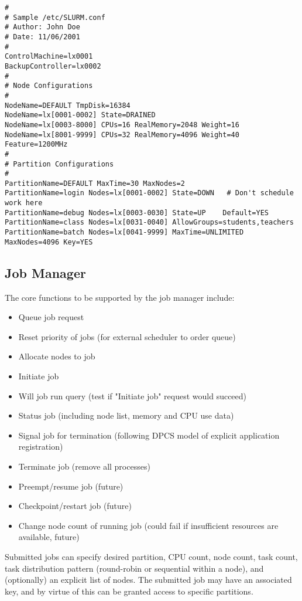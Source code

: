 \begin{verbatim}
# 
# Sample /etc/SLURM.conf
# Author: John Doe
# Date: 11/06/2001
#
ControlMachine=lx0001
BackupController=lx0002
#
# Node Configurations
#
NodeName=DEFAULT TmpDisk=16384
NodeName=lx[0001-0002] State=DRAINED
NodeName=lx[0003-8000] CPUs=16 RealMemory=2048 Weight=16
NodeName=lx[8001-9999] CPUs=32 RealMemory=4096 Weight=40 Feature=1200MHz
#
# Partition Configurations
#
PartitionName=DEFAULT MaxTime=30 MaxNodes=2
PartitionName=login Nodes=lx[0001-0002] State=DOWN   # Don't schedule work here
PartitionName=debug Nodes=lx[0003-0030] State=UP    Default=YES
PartitionName=class Nodes=lx[0031-0040] AllowGroups=students,teachers
PartitionName=batch Nodes=lx[0041-9999] MaxTime=UNLIMITED MaxNodes=4096 Key=YES
\end{verbatim}

\subsection{Job Manager}

The core functions to be supported by the job manager include:
\begin{itemize}
\item Queue job request
\item Reset priority of jobs (for external scheduler to order queue)
\item Allocate nodes to job
\item Initiate job
\item Will job run query (test if "Initiate job" request would succeed)
\item Status job (including node list, memory and CPU use data)
\item Signal job for termination (following DPCS model of explicit application
registration)
\item Terminate job (remove all processes)
\item Preempt/resume job  (future)
\item Checkpoint/restart job (future)
\item Change node count of running job (could fail if insufficient resources are 
available, future)
\end{itemize}

Submitted jobs can specify desired partition, CPU count, node count, task 
count, task distribution pattern (round-robin or sequential within a node), 
and (optionally) an explicit list of nodes. The submitted job may have an 
associated key, and by virtue of this can be granted access to specific partitions. 

